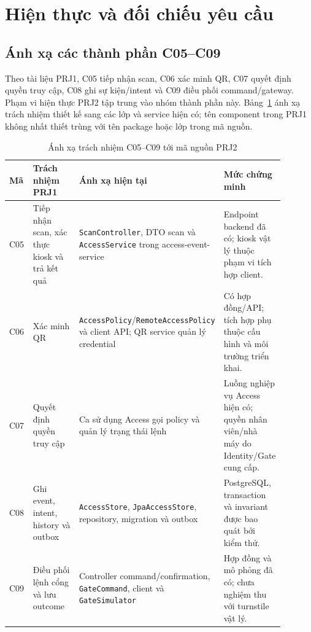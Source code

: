 ﻿\section{Hiện thực và đối chiếu yêu cầu}
\label{sec:implementation}

\subsection{Ánh xạ các thành phần C05--C09}
\label{subsec:c05-c09}
Theo tài liệu PRJ1, C05 tiếp nhận scan, C06 xác minh QR, C07 quyết định quyền truy cập, C08 ghi sự kiện/intent và C09 điều phối command/gateway. Phạm vi hiện thực PRJ2 tập trung vào nhóm thành phần này. Bảng~\ref{tab:c-mapping} ánh xạ trách nhiệm thiết kế sang các lớp và service hiện có; tên component trong PRJ1 không nhất thiết trùng với tên package hoặc lớp trong mã nguồn.

\begin{table}[htbp]
\centering
\caption{Ánh xạ trách nhiệm C05--C09 tới mã nguồn PRJ2}\label{tab:c-mapping}
\begin{tabular}{|>{\raggedright\arraybackslash}p{0.09\linewidth}|>{\raggedright\arraybackslash}p{0.22\linewidth}|>{\raggedright\arraybackslash}p{0.36\linewidth}|>{\raggedright\arraybackslash}p{0.22\linewidth}|}\hline
\textbf{Mã} & \textbf{Trách nhiệm PRJ1} & \textbf{Ánh xạ hiện tại} & \textbf{Mức chứng minh} \\\hline
C05 & Tiếp nhận scan, xác thực kiosk và trả kết quả & \texttt{ScanController}, DTO scan và \texttt{AccessService} trong access-event-service & Endpoint backend đã có; kiosk vật lý thuộc phạm vi tích hợp client. \\\hline
C06 & Xác minh QR & \texttt{AccessPolicy}/\allowbreak\texttt{RemoteAccessPolicy} và client API; QR service quản lý credential & Có hợp đồng/API; tích hợp phụ thuộc cấu hình và môi trường triển khai. \\\hline
C07 & Quyết định quyền truy cập & Ca sử dụng Access gọi policy và quản lý trạng thái lệnh & Luồng nghiệp vụ Access hiện có; quyền nhân viên/nhà máy do Identity/Gate cung cấp. \\\hline
C08 & Ghi event, intent, history và outbox & \texttt{AccessStore}, \texttt{JpaAccessStore}, repository, migration và outbox & PostgreSQL, transaction và invariant được bao quát bởi kiểm thử. \\\hline
C09 & Điều phối lệnh cổng và lưu outcome & Controller command/confirmation, \texttt{GateCommand}, client và \texttt{GateSimulator} & Hợp đồng và mô phỏng đã có; chưa nghiệm thu với turnstile vật lý. \\\hline
\end{tabular}
\end{table}

